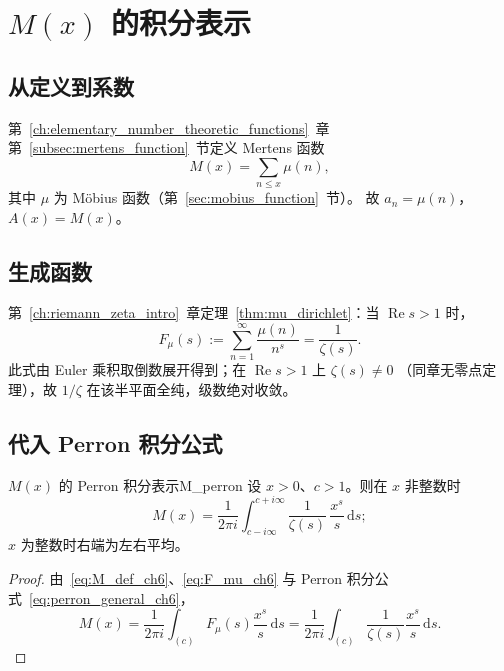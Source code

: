 \section{\texorpdfstring{$M(x)$}{M(x)} 的积分表示}
\label{sec:M_integral}

\subsection{从定义到系数}

第~\ref{ch:elementary_number_theoretic_functions}~章第~\ref{subsec:mertens_function}~节定义
Mertens 函数
\begin{equation}
  M(x)=\sum_{n\le x}\mu(n),
  \label{eq:M_def_ch6}
\end{equation}
其中 $\mu$ 为 Möbius 函数（第~\ref{sec:mobius_function}~节）。
故 $a_n=\mu(n)$，$A(x)=M(x)$。

\subsection{生成函数}

第~\ref{ch:riemann_zeta_intro}~章定理~\ref{thm:mu_dirichlet}：当 $\operatorname{Re}s>1$ 时，
\begin{equation}
  F_{\mu}(s)
  :=\sum_{n=1}^{\infty}\frac{\mu(n)}{n^{s}}
  =\frac{1}{\zeta(s)}.
  \label{eq:F_mu_ch6}
\end{equation}
此式由 Euler 乘积取倒数展开得到；在 $\operatorname{Re}s>1$ 上 $\zeta(s)\neq 0$
（同章无零点定理），故 $1/\zeta$ 在该半平面全纯，级数绝对收敛。

\subsection{代入 Perron 积分公式}

\begin{theorem}{$M(x)$ 的 Perron 积分表示}{M_perron}
设 $x>0$、$c>1$。则在 $x$ 非整数时
\begin{equation}
  M(x)
  =\frac{1}{2\pi i}
  \int_{c-i\infty}^{c+i\infty}
  \frac{1}{\zeta(s)}\,\frac{x^s}{s}\,\mathrm{d}s;
  \label{eq:M_perron}
\end{equation}
$x$ 为整数时右端为左右平均。
\end{theorem}

\begin{proof}
由~\eqref{eq:M_def_ch6}、\eqref{eq:F_mu_ch6} 与 Perron 积分公式~\eqref{eq:perron_general_ch6}，
\[
  M(x)
  =\frac{1}{2\pi i}
  \int_{(c)} F_{\mu}(s)\frac{x^s}{s}\,\mathrm{d}s
  =\frac{1}{2\pi i}
  \int_{(c)}\frac{1}{\zeta(s)}\frac{x^s}{s}\,\mathrm{d}s.
\]
\end{proof}


